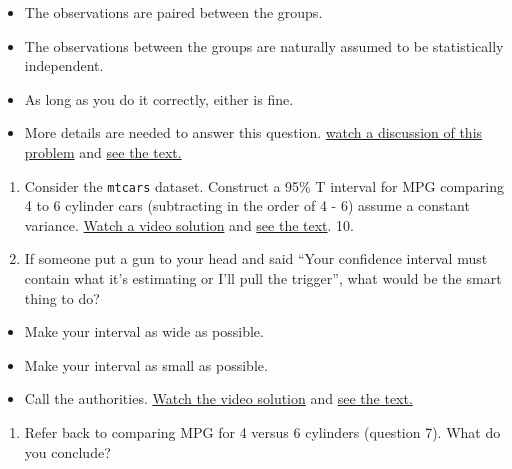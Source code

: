 \documentclass[]{article}
\begin{document}
\begin{itemize}
\itemsep1pt\parskip0pt
\item
  The observations are paired between the groups.
\item
  The observations between the groups are naturally assumed to be
  statistically independent.
\item
  As long as you do it correctly, either is fine.
\item
  More details are needed to answer this question.
  \href{https://www.youtube.com/watch?v=zJWJljxJ7Zk\&list=PLpl-gQkQivXhHOcVeU3bSJg78zaDYbP9L\&index=21}{watch
  a discussion of this problem} and
  \href{http://bcaffo.github.io/courses/06_StatisticalInference/homework/hw3.html\#5}{see
  the text.}
\end{itemize}

\begin{enumerate}
\def\labelenumi{\arabic{enumi}.}
\setcounter{enumi}{6}
\itemsep1pt\parskip0pt
\item
  Consider the \texttt{mtcars} dataset. Construct a 95\% T interval for
  MPG comparing 4 to 6 cylinder cars (subtracting in the order of 4 - 6)
  assume a constant variance.
  \href{https://www.youtube.com/watch?v=QfuMgsUlu_w\&index=23\&list=PLpl-gQkQivXhHOcVeU3bSJg78zaDYbP9L}{Watch
  a video solution} and
  \href{http://bcaffo.github.io/courses/06_StatisticalInference/homework/hw3.html\#6}{see
  the text}. 10.
\item
  If someone put a gun to your head and said ``Your confidence interval
  must contain what it's estimating or I'll pull the trigger'', what
  would be the smart thing to do?
\end{enumerate}

\begin{itemize}
\itemsep1pt\parskip0pt
\item
  Make your interval as wide as possible.
\item
  Make your interval as small as possible.
\item
  Call the authorities.
  \href{https://www.youtube.com/watch?v=8zM1RV4Rb7A\&list=PLpl-gQkQivXhHOcVeU3bSJg78zaDYbP9L\&index=24}{Watch
  the video solution} and
  \href{http://bcaffo.github.io/courses/06_StatisticalInference/homework/hw3.html\#7}{see
  the text.}
\end{itemize}

\begin{enumerate}
\def\labelenumi{\arabic{enumi}.}
\setcounter{enumi}{9}
\itemsep1pt\parskip0pt
\item
  Refer back to comparing MPG for 4 versus 6 cylinders (question 7).
  What do you conclude?
\end{enumerate}
\end{document}
